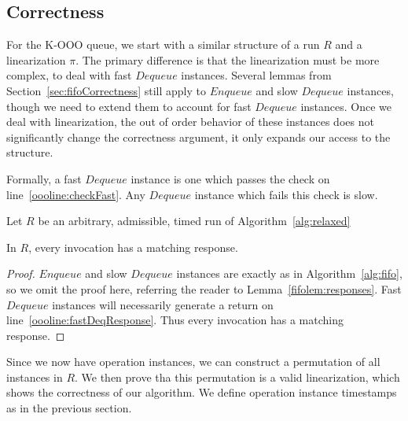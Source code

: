\documentclass[a4paper,anonymous,USenglish]{lipics-v2021} %
\theoremstyle{definition}
\begin{document}
\subsection{Correctness}
For the K-OOO queue, we start with a similar structure of a run $R$ and a linearization $\pi$. The primary difference is that the linearization must be more complex, to deal with fast $Dequeue$ instances.  Several lemmas from Section~\ref{sec:fifoCorrectness} still apply to $Enqueue$ and slow $Dequeue$ instances, though we need to extend them to account for fast $Dequeue$ instances.  Once we deal with linearization, the out of order behavior of these instances does not significantly change the correctness argument, it only expands our access to the structure.

Formally, a fast $Dequeue$ instance is one which passes the check on line~\ref{oooline:checkFast}.  Any $Dequeue$ instance which fails this check is slow.

Let $R$ be an arbitrary, admissible, timed run of Algorithm~\ref{alg:relaxed}

\begin{lemma}
 In $R$, every invocation has a matching response.
\end{lemma}

\begin{proof}
  $Enqueue$ and slow $Dequeue$ instances are exactly as in Algorithm~\ref{alg:fifo}, so we omit the proof here, referring the reader to Lemma~\ref{fifolem:responses}.  Fast $Dequeue$ instances will necessarily generate a return on line~\ref{oooline:fastDeqResponse}.  Thus every invocation has a matching response.
\end{proof}

Since we now have operation instances, we can construct a permutation of all instances in $R$.  We then prove tha this permutation is a valid linearization, which shows the correctness of our algorithm.  We define operation instance timestamps as in the previous section.
\end{document}
